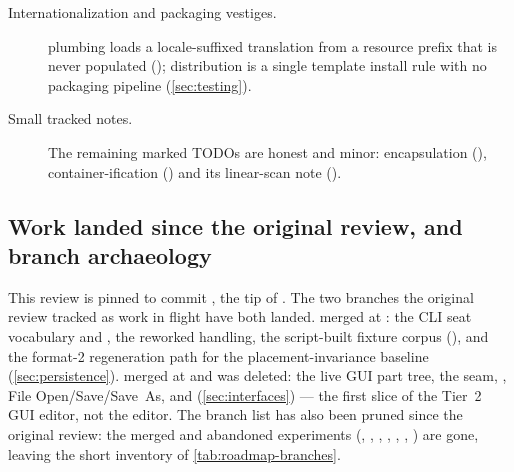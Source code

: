 \begin{description}
  \item[Internationalization and packaging vestiges.]  plumbing loads a
  locale-suffixed translation from a resource prefix that is never populated
  (); distribution is a single template install rule with no packaging
  pipeline (\cref{sec:testing}).

  \item[Small tracked notes.] The remaining marked TODOs are honest and minor: 
  encapsulation (),  container-ification
  () and its linear-scan note ().

\end{description}

\subsection{Work landed since the original review, and branch archaeology}\label{sec:roadmap-inflight}

This review is pinned to commit , the tip of . The two branches
the original review tracked as work in flight have both landed.  merged at
: the CLI seat vocabulary and , the reworked
  handling, the script-built fixture corpus
(), and the format-2 regeneration path for the
placement-invariance baseline (\cref{sec:persistence}). 
merged at  and was deleted: the live GUI part tree, the
 seam, , File Open/Save/Save~As, and
 (\cref{sec:interfaces}) --- the first slice of the
Tier~2 GUI editor, not the editor. The branch list has also been pruned since the original
review: the merged and abandoned experiments (,
, , , ,
, ) are gone, leaving the short inventory of
\cref{tab:roadmap-branches}.

